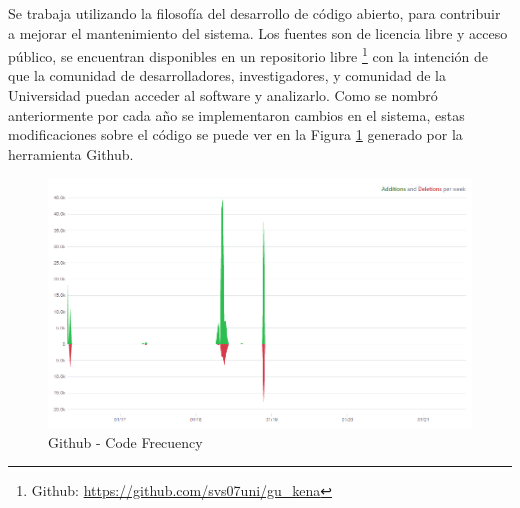Se trabaja utilizando la filosofía del desarrollo de código abierto, para contribuir a mejorar el mantenimiento del sistema. Los fuentes son de licencia libre y acceso público, se encuentran disponibles en un repositorio libre
\footnote{Github: \url{https://github.com/svs07uni/gu_kena}} 
con la intención  de que la comunidad de desarrolladores, investigadores, y comunidad de la Universidad puedan acceder al software y analizarlo.
Como se nombró anteriormente por cada año se implementaron cambios en el sistema, estas modificaciones sobre el código se puede ver en la Figura \ref{graf:codeFrecuency} generado por la herramienta Github.
\begin{figure}[h!]
    \begin{center}
        \includegraphics[width=\textwidth]{img/graficoGithub.png}
    \end{center}
  \caption{Github - Code Frecuency}
  \label{graf:codeFrecuency}
\end{figure}

